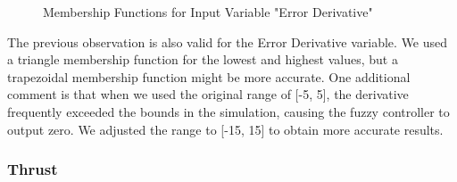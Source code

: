 \documentclass[12pt]{article}
\begin{document}
\begin{figure}[H]
    \centering
    \caption{Membership Functions for Input Variable "Error Derivative"}
\end{figure}

The previous observation is also valid for the Error Derivative variable. We used a triangle membership function for the lowest and highest values, but a trapezoidal membership function might be more accurate.
One additional comment is that when we used the original range of [-5, 5], the derivative frequently exceeded the bounds in the simulation, causing the fuzzy controller to output zero. We adjusted the range to [-15, 15] to obtain more accurate results.

\subsubsection{Thrust}
\end{document}
